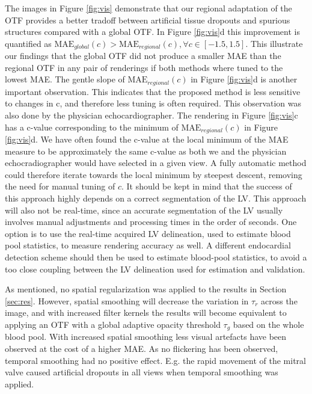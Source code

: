 The images in Figure \ref{fig:vis} demonstrate that our regional adaptation of the OTF provides a better tradoff between artificial tissue dropouts and spurious structures compared with a global OTF. In Figure \ref{fig:vis}d this improvement is quantified as $\textrm{MAE}_{global}(c) > \textrm{MAE}_{regional}(c), \forall c\in[-1.5, 1.5]$. This illustrate our findings that the global OTF did not produce a smaller MAE than the regional OTF in any pair of renderings if both methods where tuned to the lowest MAE. The gentle slope of $\textrm{MAE}_{regional}(c)$ in Figure \ref{fig:vis}d is another important observation. This indicates that the proposed method is less sensitive to changes in c, and therefore less tuning is often required. This observation was also done by the physician echocardiographer. 
The rendering in Figure \ref{fig:vis}c has a c-value corresponding to the minimum of $\textrm{MAE}_{regional}(c)$ in Figure \ref{fig:vis}d. We have often found the c-value at the local minimum of the MAE measure to be approximately the same c-value as both we and the physician echocradiographer would have selected in a given view. A fully automatic method could therefore iterate towards the local minimum by steepest descent, removing the need for manual tuning of $c$. It should be kept in mind that the success of this approach highly depends on a correct segmentation of the LV. This approach will also not be real-time, since an accurate segmentation of the LV usually involves manual adjustments and processing times in the order of seconds. One option is to use the real-time acquired LV delineation, used to estimate blood pool statistics, to measure rendering accuracy as well. A different endocardial detection scheme should then be used to estimate blood-pool statistics, to avoid a too close coupling between the LV delineation used for estimation and validation. 

As mentioned, no spatial regularization was applied to the results in Section \ref{sec:res}. However, spatial smoothing will decrease the variation in $\tau_r$ across the image, and with increased filter kernels the results will become equivalent to applying an OTF with a global adaptive opacity threshold $\tau_g$ based on the whole blood pool. With increased spatial smoothing less visual artefacts have been observed at the cost of a higher MAE. As no flickering has been observed, temporal smoothing had no positive effect. E.g. the rapid movement of the mitral valve caused artificial dropouts in all views when temporal smoothing was applied. 

